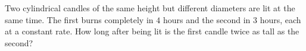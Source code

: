 Two cylindrical candles of the same height but different diameters are lit at the same time. The first burns completely in $4$ hours and the second in $3$ hours, each at a constant rate. How long after being lit is the first candle twice as tall as the second?
